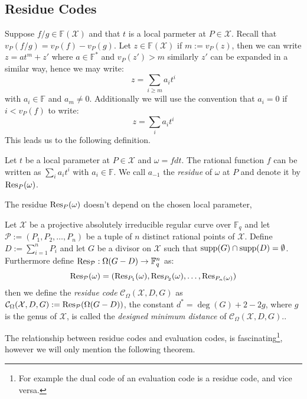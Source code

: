 \subsection{Residue Codes}
Suppose $f / g \in \mathbb{F}(\mathcal{X})$ and that $t$ is a local parmeter at $P \in \mathcal{X}$. Recall that $v_P(f / g) = v_P(f) - v_P(g)$. Let $z \in \mathbb{F}(\mathcal{X})$ if $m := v_P(z)$, then we can write $z = a t^m + z'$ where $a \in \mathbb{F}^{*}$ and $v_P(z') > m$ similarly $z'$ can be expanded in a similar way, hence we may write:
\begin{equation*}
  z = \sum_{i \geq m} a_i t^i
\end{equation*}
with $a_i \in \mathbb{F}$ and $a_m \neq 0$. Additionally we will use the convention that $a_i = 0$ if $i < v_P(f)$ to write:
\begin{equation*}
  z = \sum_i a_i t^i
\end{equation*}
This leads us to the following definition.
\begin{definition}
  Let $t$ be a local parameter at $P \in \mathcal{X}$ and $\omega = f dt$. The rational function $f$ can be written as $\sum_i a_i t^i$ with $a_i \in \mathbb{F}$. We call $a_{-1}$ the \textit{residue} of $\omega$ at $P$ and denote it by $\textnormal{Res}_P(\omega)$.
\end{definition}
The residue $\textnormal{Res}_P(\omega)$ doesn't depend on the chosen local parameter,

\begin{definition}
  Let $\mathcal{X}$ be a projective absolutely irreducible regular curve over $\mathbb{F}_q$ and let $\mathcal{P} := (P_1, P_2, \ldots, P_{n})$ be a tuple of $n$ distinct rational points of $\mathcal{X}$. Define $D := \sum^n_{i = 1} P_i$ and let $G$ be a divisor on $\mathcal{X}$ such that $\textnormal{supp}(G) \cap \textnormal{supp}(D) = \emptyset$. Furthermore define $\textnormal{Res}_{\mathcal{P}}: \Omega(G - D) \to \mathbb{F}_q^n$ as:
  \begin{equation*}
    \textnormal{Res}_{\mathcal{P}}(\omega) = (\textnormal{Res}_{P_1}(\omega), \textnormal{Res}_{P_2}(\omega), \ldots, \textnormal{Res}_{P_{n}(\omega)})
  \end{equation*}
  then we define the \textit{residue code} $\mathcal{C}_\Omega(\mathcal{X}, D, G)$ as $\mathcal{C}_\Omega(\mathcal{X}, D, G) := \textnormal{Res}_{\mathcal{P}}(\Omega(G - D))$, the constant $d^{*} = \deg(G) + 2 - 2g$, where $g$ is the genus of $\mathcal{X}$, is called the \textit{designed minimum distance} of $\mathcal{C}_{\Omega}(\mathcal{X}, D, G)$..
\end{definition}
The relationship between residue codes and evaluation codes, is fascinating\footnote{For example the dual code of an evaluation code is a residue code, and vice versa.}, however we will only mention the following theorem.

